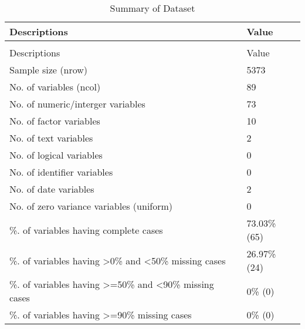 \begingroup\fontsize{9}{11}\selectfont

\begin{longtable}[t]{ll}
\caption{Summary of Dataset}\\
\toprule
Descriptions & Value\\
\midrule
\endfirsthead
\caption[]{Summary of Dataset }\\
\toprule
Descriptions & Value\\
\midrule
\endhead

\endfoot
\bottomrule
\endlastfoot
Sample size (nrow) & 5373\\
No. of variables (ncol) & 89\\
No. of numeric/interger variables & 73\\
No. of factor variables & 10\\
No. of text variables & 2\\
No. of logical variables & 0\\
No. of identifier variables & 0\\
No. of date variables & 2\\
No. of zero variance variables (uniform) & 0\\
\%. of variables having complete cases & 73.03\% (65)\\
\%. of variables having >0\% and <50\% missing cases & 26.97\% (24)\\
\%. of variables having >=50\% and <90\% missing cases & 0\% (0)\\
\%. of variables having >=90\% missing cases & 0\% (0)\\*
\end{longtable}
\endgroup{}
